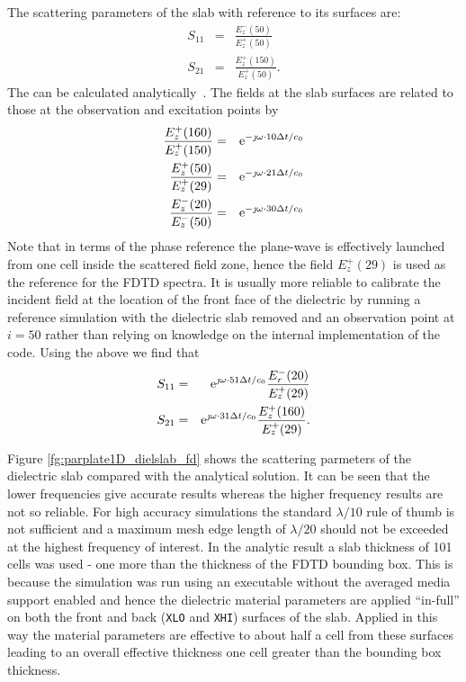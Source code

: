 \documentclass[onecolumn,a4paper]{article}
\numberwithin{equation}{section}
\begin{document}
The scattering parameters of the slab with reference to its surfaces are:
\begin{eqnarray}
S_{11} &=& \frac{E^-_z(50)}{E^+_z(50)} \\
S_{21} &=& \frac{E^+_z(150)}{E^+_z(50)}.
\end{eqnarray}
The can be calculated analytically~\cite{Orfanidis2010}. The fields at the slab surfaces are related to those at the observation and excitation points by
\begin{eqnarray}
\frac{E^+_z(160)}{E^+_z(150)} &=& \mathrm{e}^{ -\jmath \omega \cdot 10 \Delta t / c_0} \\
\frac{E^+_z(50)}{E^+_z(29)} &=& \mathrm{e}^{ -\jmath \omega \cdot 21 \Delta t / c_0} \\
\frac{E^-_z(20)}{E^-_z(50)} &=& \mathrm{e}^{ -\jmath \omega \cdot 30 \Delta t / c_0}
\end{eqnarray}
Note that in terms of the phase reference the plane-wave is effectively launched from one cell inside the
scattered field zone, hence the field $E^+_z(29)$ is used as the reference for the FDTD spectra. It
is usually more reliable to calibrate the incident field at the location of the front face of the 
dielectric by running a reference simulation with the dielectric slab removed and an observation
point at $i=50$ rather than relying on knowledge on the internal implementation of the code. Using the above we find that
\begin{eqnarray}
S_{11} &=& \mathrm{e}^{ \jmath \omega \cdot 51 \Delta t / c_0} \frac{E^-_r(20)}{E^+_z(29)} \\
S_{21} &=& \mathrm{e}^{ \jmath \omega \cdot 31 \Delta t / c_0} \frac{E^+_z(160)}{E^+_z(29)}.
\end{eqnarray}

Figure \ref{fg:parplate1D_dielslab_fd} shows the scattering parmeters of the dielectric slab compared with the analytical solution. 
It can be seen that the lower frequencies give accurate results whereas the higher frequency 
results are not so reliable. For high accuracy simulations the standard $\lambda/10$ rule of thumb is not
sufficient and a maximum mesh edge length of $\lambda/20$ should not be exceeded at the highest frequency of 
interest. In the analytic result a slab thickness of 101 cells was used - one more than
the thickness of the FDTD bounding box. This is because the simulation was run using an executable without
the averaged media support enabled and hence the dielectric material parameters are applied ``in-full'' on 
both the front and back (\texttt{XLO} and \texttt{XHI}) surfaces of the slab. Applied in this way the 
material parameters are effective to about half a cell from these surfaces leading to an overall
effective thickness one cell greater than the bounding box thickness.
\end{document}
